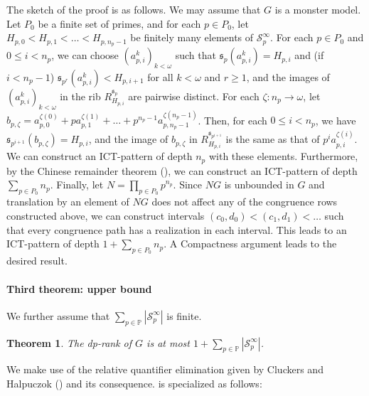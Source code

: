 \documentclass{article}
\theoremstyle{definition}
\theoremstyle{remark}
\theoremstyle{plain}
\newtheorem*{thm*}{Theorem}
\begin{document}
The sketch of the proof is as follows.
We may assume that $G$ is a monster model.
Let $P_0$ be a finite set of primes, and for each $p \in P_0$, let $H_{p,0} < H_{p,1} < \dots < H_{p,n_p-1}$ be finitely many elements of $\mathcal{S}_p^{\infty}$.
For each $p \in P_0$ and $0 \leq i < n_p$, we can choose $(a_{p,i}^k)_{k < \omega}$ such that $\mathfrak{s}_p(a_{p,i}^k) = H_{p,i}$ and (if $i < n_p - 1$) $\mathfrak{s}_{p^r}(a_{p,i}^k) < H_{p,i+1}$ for all $k < \omega$ and $r \geq 1$, and the images of $(a_{p,i}^k)_{k < \omega}$ in the rib $R_{H_{p,i}}^{\mathfrak{s}_p}$ are pairwise distinct.
For each $\zeta: n_p \to \omega$, let $b_{p,\zeta} = a_{p,0}^{\zeta(0)} + p a_{p,1}^{\zeta(1)} + \dots + p^{n_p - 1} a_{p,n_p - 1}^{\zeta(n_p - 1)}$.
Then, for each $0 \leq i < n_p$, we have $\mathfrak{s}_{p^{i+1}}(b_{p,\zeta}) = H_{p,i}$, and the image of $b_{p,\zeta}$ in $R_{H_{p,i}}^{\mathfrak{s}_{p^{i+1}}}$ is the same as that of $p^i a_{p,i}^{\zeta(i)}$.
We can construct an ICT-pattern of depth $n_p$ with these elements.
Furthermore, by the Chinese remainder theorem (\cite[Lemma 2.1 (2)]{Okura2026DisOrd}), we can construct an ICT-pattern of depth $\sum_{p \in P_0} n_p$.
Finally, let $N = \prod_{p \in P_0} p^{n_p}$.
Since $N G$ is unbounded in $G$ and translation by an element of $N G$ does not affect any of the congruence rows constructed above, we can construct intervals $(c_0, d_0) < (c_1, d_1) < \dots$ such that every congruence path has a realization in each interval.
This leads to an ICT-pattern of depth $1 + \sum_{p \in P_0} n_p$.
A Compactness argument leads to the desired result.

\paragraph{Third theorem: upper bound}

We further assume that $\sum_{p \in \mathbb{P}} \left| \mathcal{S}_p^{\infty} \right|$ is finite.

\begin{thm*}
	The dp-rank of $G$ is at most $1 + \sum_{p \in \mathbb{P}} \left| \mathcal{S}_p^{\infty} \right|$.
\end{thm*}

We make use of the relative quantifier elimination given by Cluckers and Halpuczok (\cite{Cluckers2011QuaEli}) and its consequence.
\cite[Proposition 2.26]{Okura2026DisOrd} is specialized as follows:
\end{document}
